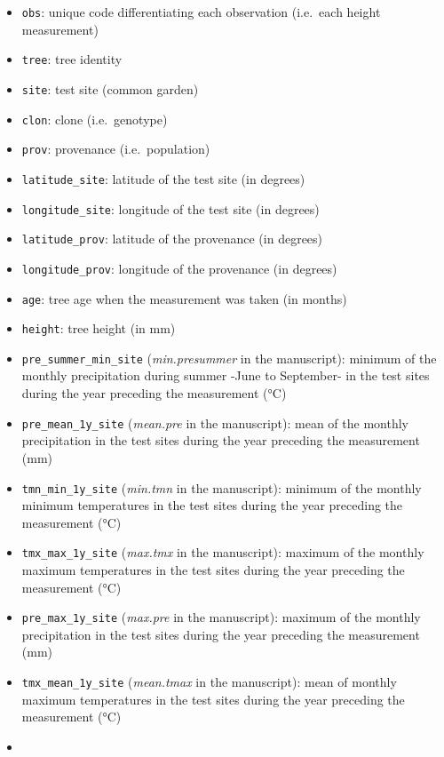 \documentclass[]{article}
\providecommand{\tightlist}{%
  \setlength{\itemsep}{0pt}\setlength{\parskip}{0pt}}
\begin{document}
\begin{itemize}
\tightlist
\item
  \texttt{obs}: unique code differentiating each observation (i.e.~each
  height measurement)
\item
  \texttt{tree}: tree identity
\item
  \texttt{site}: test site (common garden)
\item
  \texttt{clon}: clone (i.e.~genotype)
\item
  \texttt{prov}: provenance (i.e.~population)
\item
  \texttt{latitude\_site}: latitude of the test site (in degrees)
\item
  \texttt{longitude\_site}: longitude of the test site (in degrees)
\item
  \texttt{latitude\_prov}: latitude of the provenance (in degrees)
\item
  \texttt{longitude\_prov}: longitude of the provenance (in degrees)
\item
  \texttt{age}: tree age when the measurement was taken (in months)
\item
  \texttt{height}: tree height (in mm)
\item
  \texttt{pre\_summer\_min\_site} (\emph{min.presummer} in the
  manuscript): minimum of the monthly precipitation during summer -June
  to September- in the test sites during the year preceding the
  measurement (°C)
\item
  \texttt{pre\_mean\_1y\_site} (\emph{mean.pre} in the manuscript): mean
  of the monthly precipitation in the test sites during the year
  preceding the measurement (mm)
\item
  \texttt{tmn\_min\_1y\_site} (\emph{min.tmn} in the manuscript):
  minimum of the monthly minimum temperatures in the test sites during
  the year preceding the measurement (°C)
\item
  \texttt{tmx\_max\_1y\_site} (\emph{max.tmx} in the manuscript):
  maximum of the monthly maximum temperatures in the test sites during
  the year preceding the measurement (°C)
\item
  \texttt{pre\_max\_1y\_site} (\emph{max.pre} in the manuscript):
  maximum of the monthly precipitation in the test sites during the year
  preceding the measurement (mm)
\item
  \texttt{tmx\_mean\_1y\_site} (\emph{mean.tmax} in the manuscript):
  mean of monthly maximum temperatures in the test sites during the year
  preceding the measurement (°C)
\item

\end{itemize}
\end{document}
